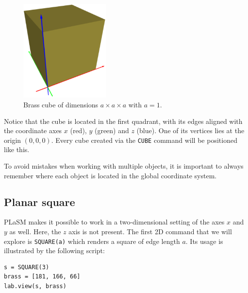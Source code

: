 \begin{figure}[!ht]
\begin{center}
\includegraphics[width=0.4\textwidth]{img/cube-111.png}
\end{center}
\vspace{-4mm}
\caption{Brass cube of dimensions $a \times a \times a$ with $a = 1$.}
\label{fig:cube-111}
\vspace{-1cm}
\end{figure}
\newpage
\noindent
Notice that the cube is located in the first quadrant, with its 
edges aligned with the coordinate axes $x$ (red), $y$ (green) and $z$ (blue). 
One of its vertices lies at the origin $(0, 0, 0)$. Every cube created via 
the {\tt CUBE} command will be positioned like this.\\

\begin{gbox}
To avoid mistakes when working with 
multiple objects, it is important to always remember where
each object is located in the global coordinate system.
\end{gbox}

\subsection{Planar square}

PLaSM makes it possible to work in a two-dimensional setting of the 
axes $x$ and $y$ as well. Here, the $z$ axis is not present. The first 
2D command that we will explore is {\tt SQUARE(a)} which renders 
a square of edge length $a$. Its usage is illustrated by the 
following script:\\

\begin{bbox}
\begin{verbatim}
s = SQUARE(3)
brass = [181, 166, 66]
lab.view(s, brass)
\end{verbatim}
\end{bbox}
\vspace{6mm}

